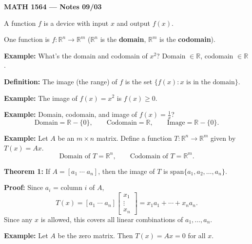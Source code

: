 \documentclass{article}
\begin{document}
\textbf{MATH 1564 --- Notes 09/03}

\bigskip

A function $f$ is a device with input $x$ and output $f(x)$.

\medskip

One function is $f: \mathbb{R}^n \to \mathbb{R}^m$ ($\mathbb{R}^n$ is the \textbf{domain}, $\mathbb{R}^m$ is the \textbf{codomain}).

\medskip

\textbf{Example:} What's the domain and codomain of $x^2$? Domain $\in \mathbb{R}$, codomain $\in \mathbb{R}$.

\bigskip

\textbf{Definition:} The image (the range) of $f$ is the set $\{f(x) : x \text{ is in the domain}\}$.

\medskip

\textbf{Example:} The image of $f(x) = x^2$ is $f(x) \geq 0$.

\medskip

\textbf{Example:} Domain, codomain, and image of $f(x) = \frac{1}{x}$?
\[
\text{Domain} = \mathbb{R} - \{0\}, \qquad \text{Codomain} = \mathbb{R}, \qquad \text{Image} = \mathbb{R} - \{0\}.
\]

\bigskip

\textbf{Example:} Let $A$ be an $m \times n$ matrix. Define a function $T: \mathbb{R}^n \to \mathbb{R}^m$ given by $T(x) = Ax$.
\[
\text{Domain of } T = \mathbb{R}^n, \qquad \text{Codomain of } T = \mathbb{R}^m.
\]

\bigskip

\textbf{Theorem 1:} If $A = [a_1 \; \cdots \; a_n]$, then the image of $T$ is $\mathrm{span}\{a_1, a_2, \ldots, a_n\}$.

\newpage

\textbf{Proof:} Since $a_i$ = column $i$ of $A$,
\[
T(x) = [a_1 \; \cdots \; a_n] \begin{bmatrix} x_1 \\ \vdots \\ x_n \end{bmatrix} = x_1 a_1 + \cdots + x_n a_n.
\]
Since any $x$ is allowed, this covers all linear combinations of $a_1, \ldots, a_n$.

\bigskip

\textbf{Example:} Let $A$ be the zero matrix. Then $T(x) = Ax = 0$ for all $x$.

\bigskip
\end{document}
